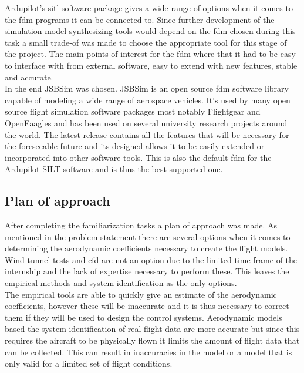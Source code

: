 Ardupilot's \gls{sitl} software package gives a wide range of options when it comes to the \gls{fdm} programs it can be connected to. Since further development of the simulation model synthesizing tools would depend on the \gls{fdm} chosen during this task a small trade-of was made to choose the appropriate tool for this stage of the project. The main points of interest for the \gls{fdm} where that it had to be easy to interface with from external software, easy to extend with new features, stable and accurate. \\

In the end JSBSim was chosen. JSBSim is an open source \gls{fdm} software library capable of modeling a wide range of aerospace vehicles. It's used by many open source flight simulation software packages most notably Flightgear and OpenEaagles and has been used on several university research projects around the world. The latest release contains all the features that will be necessary for the foreseeable future and its designed allows it to be easily extended or incorporated into other software tools. This is also the default \gls{fdm} for the Ardupilot SILT software and is thus the best supported one.

\subsection{Plan of approach}
After completing the familiarization tasks a plan of approach was made. As mentioned in the problem statement there are several options when it comes to determining the aerodynamic coefficients necessary to create the flight models. Wind tunnel tests and \gls{cfd} are not an option due to the limited time frame of the internship and the lack of expertise necessary to perform these. This leaves the empirical methods and system identification as the only options. \\

The empirical tools are able to quickly give an estimate of the aerodynamic coefficients, however these will be inaccurate and it is thus necessary to correct them if they will be used to design the control systems. Aerodynamic models based the system identification of real flight data are more accurate but since this requires the aircraft to be physically flown it limits the amount of flight data that can be collected. This can result in inaccuracies in the model or a model that is only valid for a limited set of flight conditions. \\

